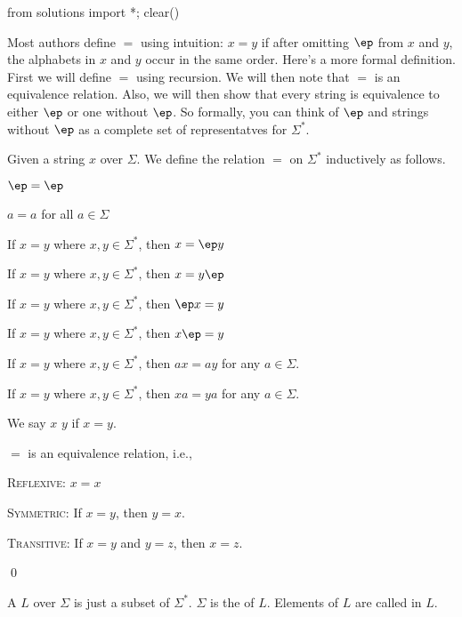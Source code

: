 \begin{python0}
from solutions import *; clear()
\end{python0}

Most authors define $=$ using intuition: $x=y$ if after omitting
$\ep$ from $x$ and $y$, the alphabets in $x$ and $y$ occur in the
same order. Here's a more formal definition. First we will define
$=$ using recursion. We will then note that $=$ is an equivalence
relation. Also, we will then show that every string is equivalence
to either $\ep$ or one without $\ep$. So formally, you can think of
$\ep$ and strings without $\ep$ as a complete set of representatves
for $\Sigma^*$.

\begin{defn}
Given a string $x$ over $\Sigma$. We define the relation $=$ on
$\Sigma^*$ inductively as follows.
\begin{myenum}
\item  $\ep = \ep$
\item  $a = a$ for all $a \in \Sigma$
\item  If $x = y$ where $x,y \in \Sigma^*$, then $x = \ep y$
\item  If $x = y$ where $x,y \in \Sigma^*$, then $x = y \ep$
\item  If $x = y$ where $x,y \in \Sigma^*$, then $\ep x = y$
\item  If $x = y$ where $x,y \in \Sigma^*$, then $x \ep = y$
\item  If $x = y$ where $x,y \in \Sigma^*$, then $ax = ay$ for any $a \in \Sigma$.
\item  If $x = y$ where $x,y \in \Sigma^*$, then $xa = ya$ for any $a \in \Sigma$.
\end{myenum}
We say $x$  $y$
if $x=y$.
\end{defn}




\begin{prop}
$=$ is an equivalence relation, i.e.,
\begin{myenum}
\item \textsc{Reflexive:} $x = x$
\item \textsc{Symmetric:} If $x = y$, then $y = x$.
\item \textsc{Transitive:} If $x = y$ and $y = z$, then $x = z$.
\end{myenum}
\qed
\end{prop}



\begin{defn}
  A
  $L$ over $\Sigma$ is just a subset of $\Sigma^*$.
  $\Sigma$ is the
  of $L$.
  Elements of $L$ are called
  \sidebarskip{12pt}
  in $L$.
\end{defn}
